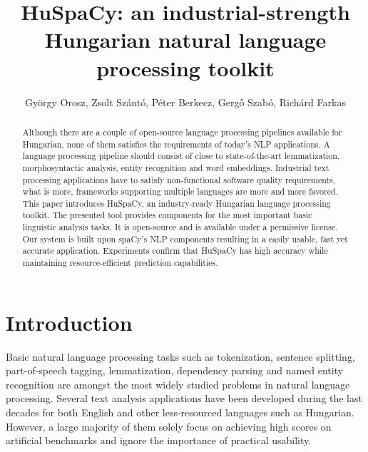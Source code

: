 \documentclass{llncs}
\newcommand{\huspacy}{HuSpaCy}
\begin{document}
\pagestyle{myheadings}
\def\leftmark{{\rm XVIII. Magyar Sz\'am\'\i t\'og\'epes Nyelv\'eszeti Konferencia}}
\def\rightmark{{\rm Szeged, 2022. január 27-28.}}


\title{\huspacy: an industrial-strength Hungarian natural language processing toolkit}

\author{
György Orosz,
Zsolt Szántó, \break
Péter Berkecz,
Gergő Szabó,
Richárd Farkas\\
\break
{}\break
}

\maketitle

\begin{abstract}
Although there are a couple of open-source language processing pipelines available for Hungarian, none of them satisfies the requirements of today’s NLP applications. 
A language processing pipeline should consist of close to state-of-the-art lemmatization, morphosyntactic analysis, entity recognition and word embeddings. 
Industrial text processing applications have to satisfy non-functional software quality requirements, what is more, frameworks supporting multiple languages are more and more favored.
This paper introduces \huspacy, an industry-ready Hungarian language processing toolkit. 
The presented tool provides components for the most important basic linguistic analysis tasks. It is open-source and is available under a permissive license. 
Our system is built upon spaCy’s NLP components resulting in a easily usable, fast yet accurate application.
Experiments confirm that HuSpaCy has high accuracy while maintaining resource-efficient prediction capabilities. 
\end{abstract}

\section{Introduction}

Basic natural language processing tasks such as tokenization, sentence splitting, part-of-speech tagging, lemmatization, dependency parsing and named entity recognition are amongst the most widely studied problems in natural language processing. Several text analysis applications have been developed during the last decades for both English and other less-resourced languages such as Hungarian. However, a large majority of them solely focus on achieving high scores on artificial benchmarks and ignore the importance of practical usability.
\end{document}
